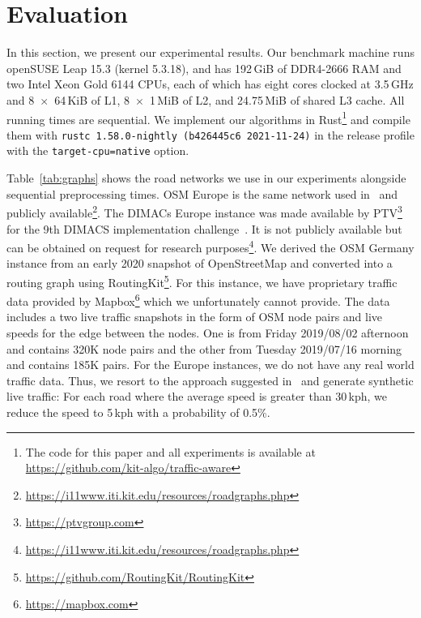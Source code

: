 \documentclass[a4paper,UKenglish,cleveref, autoref, thm-restate]{lipics-v2021}
\begin{document}
\section{Evaluation}

In this section, we present our experimental results.
Our benchmark machine runs openSUSE Leap 15.3 (kernel 5.3.18), and has 192\,GiB of DDR4-2666 RAM and two Intel Xeon Gold 6144 CPUs, each of which has eight cores clocked at 3.5\,GHz and 8~$\times$~64\,KiB of L1, 8~$\times$~1\,MiB of L2, and 24.75\,MiB of shared L3 cache.
All running times are sequential.
We implement our algorithms in Rust\footnote{The code for this paper and all experiments is available at \url{https://github.com/kit-algo/traffic-aware}} and compile them with \texttt{rustc 1.58.0-nightly (b426445c6 2021-11-24)} in the release profile with the \texttt{target-cpu=native} option.

\begin{table}
\centering
\caption{
Instances used in the evaluation with sequential preprocessing running times to construct a CCH-Potential.
Phase 1 needs to be run only once for each graph, Phase 2 once for each metric, or when a metric changes.
}\label{tab:graphs}

\end{table}

Table~\ref{tab:graphs} shows the road networks we use in our experiments alongside sequential preprocessing times.
OSM Europe is the same network used in~\cite{dss-tarrn-18} and publicly available\footnote{\url{https://i11www.iti.kit.edu/resources/roadgraphs.php}}.
The DIMACs Europe instance was made available by PTV\footnote{\url{https://ptvgroup.com}} for the 9th DIMACS implementation challenge~\cite{DemetrescuGJ09}.
It is not publicly available but can be obtained on request for research purposes\footnote{\url{https://i11www.iti.kit.edu/resources/roadgraphs.php}}.
We derived the OSM Germany instance from an early 2020 snapshot of OpenStreetMap and converted into a routing graph using RoutingKit\footnote{\url{https://github.com/RoutingKit/RoutingKit}}.
For this instance, we have proprietary traffic data provided by Mapbox\footnote{\url{https://mapbox.com}} which we unfortunately cannot provide.
The data includes a two live traffic snapshots in the form of OSM node pairs and live speeds for the edge between the nodes.
One is from Friday 2019/08/02 afternoon and contains 320K node pairs and the other from Tuesday 2019/07/16 morning and contains 185K pairs.
For the Europe instances, we do not have any real world traffic data.
Thus, we resort to the approach suggested in~\cite{dss-tarrn-18} and generate synthetic live traffic:
For each road where the average speed is greater than 30\,kph, we reduce the speed to 5\,kph with a probability of 0.5\%.
\end{document}
